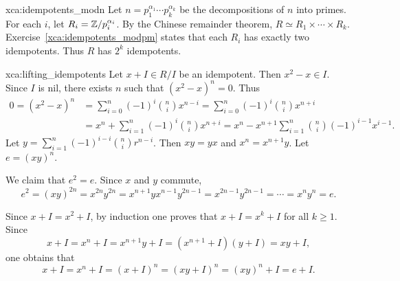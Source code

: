\begin{sol}{xca:idempotents_modn}
    Let $n=p_1^{\alpha_1}\cdots p_k^{\alpha_k}$ be the decompositions 
    of $n$ into primes. For each $i$, let $R_i=\mathbb{Z}/p_i^{\alpha_i}$. By the 
    Chinese remainder theorem, $R\simeq R_1\times\cdots\times R_k$. Exercise~\ref{xca:idempotents_modpm} states that each $R_i$ has exactly  
    two idempotents. Thus $R$ has $2^k$ idempotents. 
\end{sol}

\begin{sol}{xca:lifting_idempotents}
    Let $x+I\in R/I$ be an idempotent. Then $x^2-x\in I$. Since $I$ is nil, 
    there exists $n$ such that $(x^2-x)^n=0$. Thus 
    \begin{align*}    
    0=(x^2-x)^n&=\sum_{i=0}^n (-1)^i\binom{n}{i}x^{n-i}
    =\sum_{i=0}^n(-1)^i\binom{n}{i}x^{n+i}\\
    &=x^n+\sum_{i=1}^n(-1)^i\binom{n}{i}x^{n+i}
    =x^n-x^{n+1}\sum_{i=1}^n\binom{n}{i}(-1)^{i-1}x^{i-1}.
    \end{align*}
    Let $y=\sum_{i=1}^n (-1)^{i-i}\binom{n}{i}r^{n-i}$. Then 
    $xy=yx$ and $x^n=x^{n+1}y$. Let $e=(xy)^n$. 

    We claim that $e^2=e$. Since $x$ and $y$ commute, 
    \[
    e^2=(xy)^{2n}=x^{2n}y^{2n}=x^{n+1}yx^{n-1}y^{2n-1}=x^{2n-1}y^{2n-1}=\cdots=x^ny^n=e.
    \]
    
    Since $x+I=x^2+I$, 
    by induction one proves that $x+I=x^k+I$ for all $k\geq1$. Since 
    \[
    x+I=x^n+I=x^{n+1}y+I=(x^{n+1}+I)(y+I)=xy+I, 
    \]
    one obtains that 
    \[
    x+I=x^n+I=(x+I)^n=(xy+I)^n=(xy)^n+I=e+I.
    \]
\end{sol}


